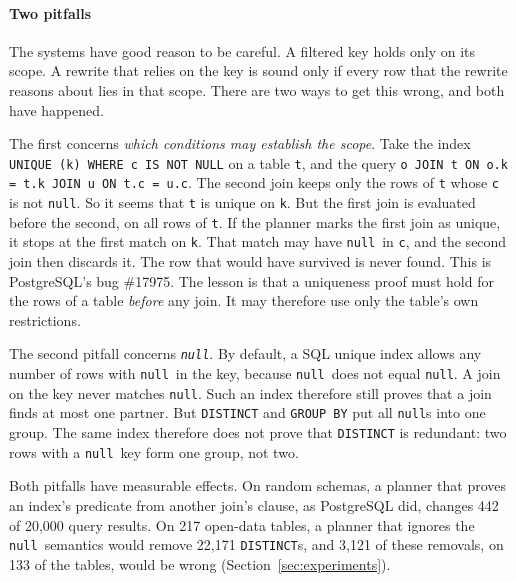 \documentclass[conference]{IEEEtran}
\theoremstyle{definition}
\newcommand{\sql}[1]{\texttt{#1}}
\newcommand{\nul}{\texttt{null}}
\begin{document}
\paragraph*{Two pitfalls} The systems have good reason to be careful. A filtered key holds only on its scope. A
rewrite that relies on the key is sound only if every row that the rewrite reasons about lies in that scope. There
are two ways to get this wrong, and both have happened.

The first concerns \emph{which conditions may establish the scope}. Take the index \sql{UNIQUE (k) WHERE c IS NOT
NULL} on a table \sql{t}, and the query \sql{o JOIN t ON o.k = t.k JOIN u ON t.c = u.c}. The second join keeps only
the rows of \sql{t} whose \sql{c} is not \nul. So it seems that \sql{t} is unique on \sql{k}. But the first join is
evaluated before the second, on all rows of \sql{t}. If the planner marks the first join as unique, it stops at the
first match on \sql{k}. That match may have \nul\ in \sql{c}, and the second join then discards it. The row that would
have survived is never found. This is PostgreSQL's bug \#17975. The lesson is that a uniqueness proof must hold for
the rows of a table \emph{before} any join. It may therefore use only the table's own restrictions.

The second pitfall concerns \emph{\nul}. By default, a SQL unique index allows any number of rows with \nul\ in the
key, because \nul\ does not equal \nul. A join on the key never matches \nul. Such an index therefore still proves that a
join finds at most one partner. But \sql{DISTINCT} and \sql{GROUP BY} put all \nul s into one group. The same index
therefore does not prove that \sql{DISTINCT} is redundant: two rows with a \nul\ key form one group, not two.

Both pitfalls have measurable effects. On random schemas, a planner that proves an index's predicate from another join's
clause, as PostgreSQL did, changes 442 of 20{,}000 query results. On 217 open-data tables, a planner that ignores the
\nul\ semantics would remove 22{,}171 \sql{DISTINCT}s, and 3{,}121 of these removals, on 133 of the tables, would be
wrong (Section~\ref{sec:experiments}).
\end{document}

